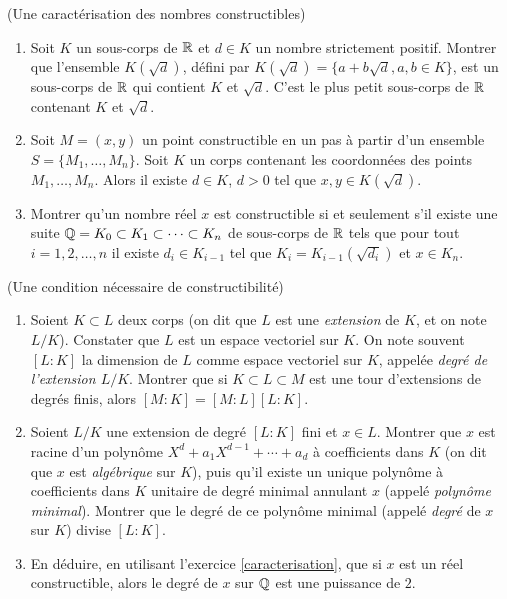 \documentclass[a4paper,11pt,reqno]{amsart}
\begin{document}
\begin{exo} \label{caracterisation} (Une caractérisation des nombres constructibles)

  \begin{enumerate}
    \item Soit $K$ un sous-corps de $\mathbb{R}$ et $d \in K$ un nombre strictement positif. Montrer que l'ensemble $K(\sqrt{d})$, défini par $K(\sqrt{d})=\{a+b\sqrt{d}, a, b \in K\}$, est un sous-corps de $\mathbb{R}$ qui contient $K$ et $\sqrt{d}$. C'est le plus petit sous-corps de $\mathbb{R}$ contenant $K$ et $\sqrt{d}$.
    \item Soit $M=(x,y)$ un point constructible en un pas à partir d'un ensemble $S=\{M_1,\ldots,M_n\}$. Soit $K$ un corps contenant les coordonnées des points $M_1,\ldots,M_n$. Alors il existe $d \in K$, $d>0$ tel que $x,y \in K(\sqrt{d})$.
    \item Montrer qu'un nombre réel $x$ est constructible si et seulement s'il existe une suite $\mathbb{Q}=K_0 \subset K_1 \subset \cdots \subset K_n$ de sous-corps de $\mathbb{R}$ tels que pour tout $i=1,2,\ldots,n$ il existe $d_i \in K_{i-1}$ tel que $K_i=K_{i-1}(\sqrt{d_i})$ et $x \in K_n$.
  \end{enumerate}
\end{exo}


\begin{exo}  (Une condition nécessaire de constructibilité)
  \begin{enumerate}
    \item Soient $K \subset L$ deux corps (on dit que $L$ est une \emph{extension} de $K$, et on note $L/K$). Constater que $L$ est un espace vectoriel sur $K$. On note souvent $[L:K]$ la dimension de $L$ comme espace vectoriel sur $K$, appelée \emph{degré de l'extension $L/K$}. Montrer que si $K \subset L \subset M$ est une tour d'extensions de degrés finis, alors $[M:K]=[M:L][L:K]$.
    \item Soient $L/K$ une extension de degré $[L:K]$ fini et $x \in L$. Montrer que $x$ est racine d'un polynôme $X^d+a_1 X^{d-1} + \cdots + a_d$ à coefficients dans $K$ (on dit que $x$ est \emph{algébrique} sur $K$), puis qu'il existe un unique polynôme à coefficients dans $K$ unitaire de degré minimal annulant $x$ (appelé \textit{polynôme minimal}). Montrer que le degré de ce polynôme minimal (appelé \emph{degré} de $x$ sur $K$) divise $[L:K]$.
    \item En déduire, en utilisant l'exercice \ref{caracterisation}, que si $x$ est un réel constructible, alors le degré de $x$ sur $\mathbb{Q}$ est une puissance de $2$.
  \end{enumerate}
\end{exo}
\end{document}
